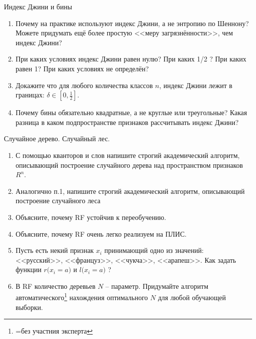 \begin{frame}{Индекс Джини и бины}
	\begin{enumerate}
	\item Почему на практике используют индекс Джини, а не энтропию по Шеннону? 
	Можете придумать ещё более простую <<меру загрязнённости>>, чем индекс Джини?
	\item При каких условиях индекс Джини равен нулю? При каких 1/2 ? 
	При каких равен 1? При каких условиях не определён?
	\item Докажите что для любого количества классов $n$, индекс Джини лежит в границах: $\delta \in [0, \frac{1}{2}]$.
	\item Почему бины обязательно квадратные, а не круглые или треугольные? Какая разница
	в каком подпространстве признаков рассчитывать индекс Джини? 	
	\end{enumerate}
\end{frame}



\begin{frame}{Случайное дерево. Случайный лес.}
	\begin{enumerate}
	\item С помощью кванторов и слов 
	напишите строгий академический алгоритм,
	описывающий построение случайного дерева 
	над пространством признаков $R^n$.
	\item Аналогично п.1, напишите 
	строгий академический алгоритм,
	описывающий построение случайного леса
	\item Объясните, почему RF устойчив к переобучению.
	\item Объясните, почему RF очень легко реализуем на ПЛИС.
	\item Пусть есть некий признак $x_i$ принимающий одно из значений: 
	<<русский>>, <<француз>>, <<чукча>>, <<арапеш>>. Как задать функции
	$r\big(x_i=a\big)$ и $l\big(x_i=a\big)$ ? 
	\item В RF количество деревьев $N$ -- параметр. 
	Придумайте алгоритм автоматического\footnote{=без участния эксперта} нахождения оптимального $N$
	для любой обучающей выборки.
	\end{enumerate} 
\end{frame} 

